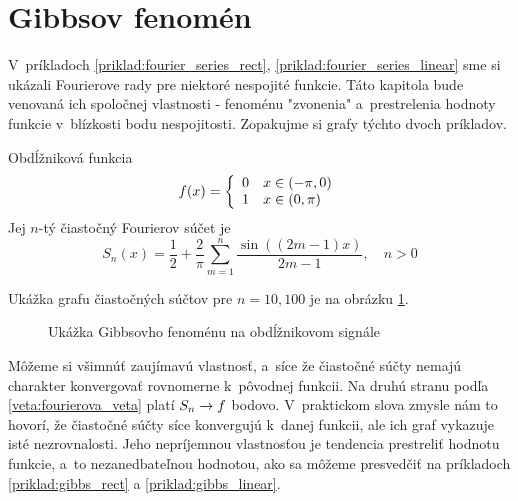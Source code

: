 \section{Gibbsov fenomén}
\label{section:gibbs}

V~príkladoch \ref{priklad:fourier_series_rect},
\ref{priklad:fourier_series_linear}
sme si ukázali Fourierove rady pre niektoré
nespojité funkcie. Táto kapitola bude venovaná ich spoločnej
vlastnosti - fenoménu "zvonenia" a~prestrelenia hodnoty funkcie 
v~blízkosti bodu nespojitosti. Zopakujme si grafy týchto dvoch príkladov.
\begin{priklad}
    Obdĺžniková funkcia
    \begin{equation*}
        f(x) = \left\{
            \begin{array}{l l}
                0 \quad x \in (-\pi,0) \\
                1 \quad x \in (0,\pi)
            \end{array}
        \right.
    \end{equation*}
    Jej $n$-tý čiastočný Fourierov súčet je
    \begin{equation*}
        S_n(x) = \frac{1}{2} + \frac{2}{\pi} \sum_{m=1}^{n}
                \frac{\sin\left( (2m-1) x\right)}{2m-1}, \quad n>0
    \end{equation*}

    Ukážka grafu čiastočných súčtov pre $n=10,100$ je na obrázku
    \ref{fig:gibbs_rect}.
    \begin{figure}[htp]
        \centering
        \caption{Ukážka Gibbsovho fenoménu na obdĺžnikovom signále}
        \label{fig:gibbs_rect}
    \end{figure}
    \label{priklad:gibbs_rect}
\end{priklad}
Môžeme si všimnúť zaujímavú vlastnosť, a~síce že čiastočné súčty
nemajú charakter konvergovať rovnomerne k~pôvodnej funkcii. Na druhú
stranu podľa \ref{veta:fourierova_veta} 
platí $S_n \rightarrow f$ bodovo. V~praktickom slova
zmysle nám to hovorí, že čiastočné súčty síce konvergujú k~danej
funkcii, ale ich graf vykazuje isté nezrovnalosti. Jeho nepríjemnou
vlastnosťou je tendencia prestreliť hodnotu funkcie, a~to
nezanedbateľnou hodnotou, ako sa môžeme presvedčiť na príkladoch
\ref{priklad:gibbs_rect} a \ref{priklad:gibbs_linear}.

